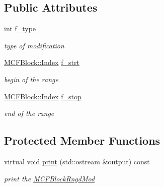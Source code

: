 \subsection*{Public Attributes}
\begin{DoxyCompactItemize}
\item 
\mbox{\label{class_s_m_spp__di__unipi__it_1_1_m_c_f_block_rngd_mod_a102e30a031044d9e821316a075e882b1}} 
int \mbox{\hyperlink{class_s_m_spp__di__unipi__it_1_1_m_c_f_block_rngd_mod_a102e30a031044d9e821316a075e882b1}{f\+\_\+type}}
\begin{DoxyCompactList}\small\item\em type of modification \end{DoxyCompactList}\item 
\mbox{\label{class_s_m_spp__di__unipi__it_1_1_m_c_f_block_rngd_mod_a35eacfc59714c8708a50727f7b1e870c}} 
\mbox{\hyperlink{class_s_m_spp__di__unipi__it_1_1_m_c_f_block_ad53d6229d7ec28555a9c9c2fd9abf773}{M\+C\+F\+Block\+::\+Index}} \mbox{\hyperlink{class_s_m_spp__di__unipi__it_1_1_m_c_f_block_rngd_mod_a35eacfc59714c8708a50727f7b1e870c}{f\+\_\+strt}}
\begin{DoxyCompactList}\small\item\em begin of the range \end{DoxyCompactList}\item 
\mbox{\label{class_s_m_spp__di__unipi__it_1_1_m_c_f_block_rngd_mod_a06be04adf7ea04448ce48d442236167e}} 
\mbox{\hyperlink{class_s_m_spp__di__unipi__it_1_1_m_c_f_block_ad53d6229d7ec28555a9c9c2fd9abf773}{M\+C\+F\+Block\+::\+Index}} \mbox{\hyperlink{class_s_m_spp__di__unipi__it_1_1_m_c_f_block_rngd_mod_a06be04adf7ea04448ce48d442236167e}{f\+\_\+stop}}
\begin{DoxyCompactList}\small\item\em end of the range \end{DoxyCompactList}\end{DoxyCompactItemize}
\subsection*{Protected Member Functions}
\begin{DoxyCompactItemize}
\item 
\mbox{\label{class_s_m_spp__di__unipi__it_1_1_m_c_f_block_rngd_mod_a2e7b9c9148a98c5c342e8c25cac95926}} 
virtual void \mbox{\hyperlink{class_s_m_spp__di__unipi__it_1_1_m_c_f_block_rngd_mod_a2e7b9c9148a98c5c342e8c25cac95926}{print}} (std\+::ostream \&output) const
\begin{DoxyCompactList}\small\item\em print the \mbox{\hyperlink{class_s_m_spp__di__unipi__it_1_1_m_c_f_block_rngd_mod}{M\+C\+F\+Block\+Rngd\+Mod}} \end{DoxyCompactList}\end{DoxyCompactItemize}
